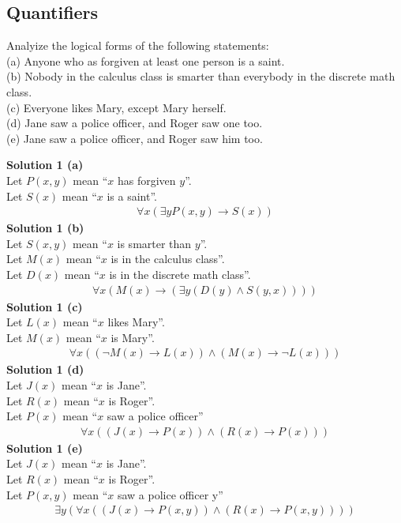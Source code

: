 \subsection{Quantifiers}

\begin{tcolorbox}[title=Problem 1, breakable]
Analyize the logical forms of the following statements: \\
(a) Anyone who as forgiven at least one person is a saint. \\
(b)  Nobody in the calculus class is smarter than everybody in the discrete
math class. \\
(c) Everyone likes Mary, except Mary herself. \\
(d) Jane saw a police officer, and Roger saw one too. \\
(e) Jane saw a police officer, and Roger saw him too. 
\end{tcolorbox}

\textbf{Solution 1 (a)} \\
Let $P(x, y)$ mean ``$x$ has forgiven $y$''. \\
Let $S(x)$ mean ``$x$ is a saint''. \\
\begin{align*}
    \forall{x}(\exists{y}P(x, y) \rightarrow S(x))
\end{align*}
\textbf{Solution 1 (b)} \\
Let $S(x, y)$ mean ``$x$ is smarter than $y$''. \\
Let $M(x)$ mean ``$x$ is in the calculus class''. \\ 
Let $D(x)$ mean ``$x$ is in the discrete math class''. \\
\begin{align*}
    \forall{x}(M(x) \rightarrow (\exists{y}(D(y) \wedge S(y, x))))
\end{align*}
\textbf{Solution 1 (c)} \\
Let $L(x)$ mean ``$x$ likes Mary''. \\
Let $M(x)$ mean ``$x$ is Mary''. \\
\begin{align*}
    \forall{x}((\neg M(x) \rightarrow L(x)) \wedge (M(x) \rightarrow \neg L(x)))
\end{align*}
\textbf{Solution 1 (d)} \\
Let $J(x)$ mean ``$x$ is Jane''. \\
Let $R(x)$ mean ``$x$ is Roger''. \\
Let $P(x)$ mean ``$x$ saw a police officer'' \\
\begin{align*}
    \forall{x}((J(x) \rightarrow P(x)) \wedge (R(x) \rightarrow P(x)))
\end{align*}
\textbf{Solution 1 (e)} \\
Let $J(x)$ mean ``$x$ is Jane''. \\
Let $R(x)$ mean ``$x$ is Roger''. \\
Let $P(x, y)$ mean ``$x$ saw a police officer y'' \\
\begin{align*}
    \exists{y}(\forall{x}((J(x) \rightarrow P(x, y)) \wedge (R(x) \rightarrow P(x, y))))
\end{align*}

